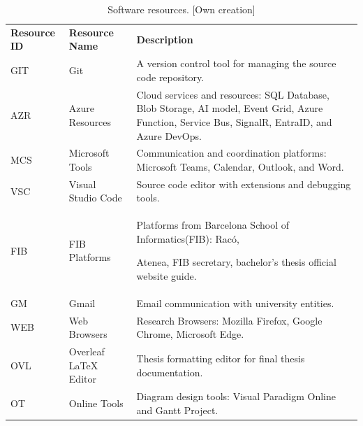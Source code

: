 \begin{table}[H]
    \centering 
    \scriptsize
    \renewcommand{\arraystretch}{1.5}
    \setlength{\arrayrulewidth}{0.8pt}
    \begin{tabularx}{\textwidth}{>{\centering\arraybackslash}m{1.2cm} >{\centering\arraybackslash}m{1.9cm} >{\raggedright\arraybackslash}m{11cm}}
        \rowcolor{gray!40} 
        \textbf{Resource ID} & \textbf{Resource Name} & \parbox[c][\height][c]{\hsize}{\centering \textbf{Description}} \\ 
        GIT & Git & A version control tool for managing the source code repository. \\ 
        AZR & Azure Resources & Cloud services and resources: SQL Database, Blob Storage, AI model, Event Grid, Azure Function, Service Bus, SignalR, EntraID, and Azure 
        DevOps. \\ 
        MCS & Microsoft Tools & Communication and coordination platforms: Microsoft Teams, Calendar, Outlook, and Word. \\ 
        VSC & Visual Studio Code & Source code editor with extensions and debugging tools. \\ 
        FIB & FIB Platforms & Platforms from Barcelona School of Informatics(FIB): Racó,    
        
        Atenea, FIB secretary, bachelor's thesis official website guide. \\ 
        GM & Gmail & Email communication with university entities. \\ 
        WEB & Web Browsers & Research Browsers: Mozilla Firefox, Google Chrome, Microsoft Edge. \\ 
        OVL & Overleaf LaTeX Editor & Thesis formatting editor for final thesis documentation. \\ 
        OT & Online Tools & Diagram design tools: Visual Paradigm Online and Gantt Project. \\ 
    \end{tabularx}
    \normalsize
    \caption[ Software resources]
    {Software resources. [Own creation]} 
    \vspace{-0.4em}
    \label{table:software-resources-table}
\end{table}

